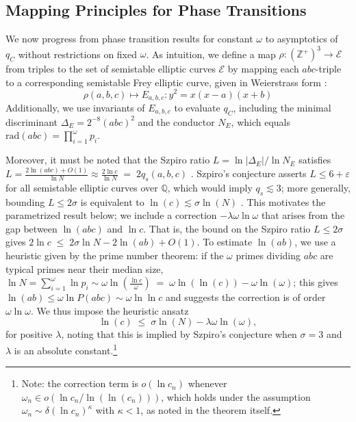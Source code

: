 \documentclass[11pt,letterpaper]{amsart}
\def\Z{\mathbb{Z}}
\def\ra{\rightarrow}
\def\Z{\mathbb{Z}}
\begin{document}
\subsection{Mapping Principles for Phase Transitions}

We now progress from phase transition results for constant $\omega$ to asymptotics of $q_C$ without restrictions on fixed $\omega$. As intuition, we define a map $\rho: (\Z^+)^3 \ra \mathcal{E}$ from triples to the set of semistable elliptic curves $\mathcal{E}$ by mapping each $abc$-triple to a corresponding semistable Frey elliptic curve, given in Weierstrass form \cite{silverman2009arithmetic, frey1986links}:
\[
     \rho(a, b, c) \mapsto E_{a, b, c}: y^2 = x(x - a)(x + b)
\]
Additionally, we use invariants of $E_{a,b,c}$ to evaluate  $q_C$, including the minimal discriminant $\Delta_E = 2^{-8} (abc)^2$ and the conductor $N_E$, which equals $\mathrm{rad}(abc) = \prod_{i=1}^{\omega} p_i$. 

Moreover, it must be noted that the Szpiro ratio $L = \ln|\Delta_E|/\ln N_E$ satisfies 
$L = \frac{2\ln(abc)+O(1)}{\ln N} \approx \frac{2\ln c}{\ln N} \;=\; 2 q_s(a, b, c)$ 
\cite{szpiro1981proprietes}. Szpiro's conjecture asserts $L \le 6+\varepsilon$ for all 
semistable elliptic curves over $\mathbb{Q}$, which would imply $q_s \lesssim 3$; more 
generally, bounding $L \le 2\sigma$ is equivalent to $\ln(c) \lesssim \sigma\ln(N)$ \cite{granville2002, szpiro1981proprietes}. 
This motivates the parametrized result below; we include a correction $-\lambda\omega\ln\omega$ 
that arises from the gap between $\ln(abc)$ and $\ln c$. That is, the bound on the Szpiro ratio $L \le 2\sigma$ gives $2\ln c \;\le\; 2\sigma\ln N - 2\ln(ab) + O(1)$. To estimate $\ln(ab)$, we use a heuristic given by the prime number theorem: if the $\omega$ primes dividing $abc$ are typical primes near their 
median size, $\ln N = \sum_{i=1}^{\omega}\ln p_i \sim  \omega\ln\!\left(\frac{\ln c}{\omega}\right) 
    \;=\; \omega\ln(\ln (c)) - \omega\ln(\omega)$; this gives $\ln(ab) \le \omega\ln P(abc) \sim \omega\ln\ln c$ and suggests the  correction is of order $\omega\ln\omega$. We thus impose the heuristic ansatz \[
    \ln (c) \;\le\; \sigma\ln (N) - \lambda\omega \ln(\omega),
\]
for positive $\lambda$, noting that this is implied by Szpiro's conjecture when $\sigma = 3$ and $\lambda$ is 
an absolute constant.\footnote{Note: the correction term is $o(\ln c_n)$ whenever 
$\omega_n \in o(\ln c_n / \ln(\ln (c_n)))$, which holds under the assumption $\omega_n \sim \delta(\ln c_n)^\kappa$ with $\kappa < 1$, as noted in the theorem itself.}
\end{document}
